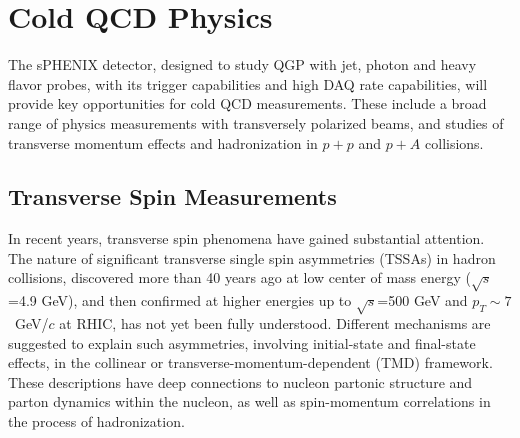  





\section{Cold QCD Physics}
\label{sec:ColdQCD}

The sPHENIX detector, designed to study QGP with jet, photon and heavy flavor probes, with its trigger capabilities and high DAQ rate capabilities, will provide key opportunities for cold QCD measurements. These include a broad range of physics measurements with transversely polarized beams, and studies of transverse momentum effects and hadronization in $p+p$ and $p+A$ collisions. 


\subsection {Transverse Spin Measurements}

In recent years, transverse spin phenomena have gained substantial attention. The nature of significant transverse single spin asymmetries (TSSAs) in hadron collisions, discovered more than 40 years ago at low center of mass energy ($\sqrt{s}$=4.9 GeV), and then confirmed at higher energies up to $\sqrt{s}$=500 GeV and $p_T \sim 7$~GeV/$c$ at RHIC, has not yet been fully understood. Different mechanisms are suggested to explain such asymmetries, involving initial-state and final-state effects, in the collinear or transverse-momentum-dependent (TMD) framework. These descriptions have deep connections to nucleon partonic structure and parton dynamics within the nucleon, as well as spin-momentum correlations in the process of hadronization.

